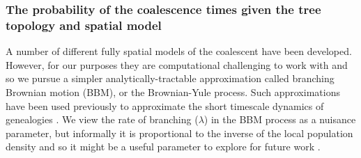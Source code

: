 \documentclass[12pt]{article}
\begin{document}
\subsubsection*{The probability of the coalescence times given the tree topology and spatial model}

A number of different fully spatial models of the coalescent have been developed. 
However, for our purposes they are computational challenging to work with and so we pursue a simpler analytically-tractable approximation called branching Brownian motion (BBM), or the Brownian-Yule process. 
Such approximations have been used previously to approximate the short timescale dynamics of genealogies \citep{edwards1970estimation,rannala1996probability,meligkotsidou2007postprocessing}. 
We view the rate of branching ($\lambda$) in the BBM process as a nuisance parameter, but informally it is proportional to the inverse of the local population density and so it might be a useful parameter to explore for future work \citep[for a recent application see][]{ringbauer2017inferring}.
\end{document}
